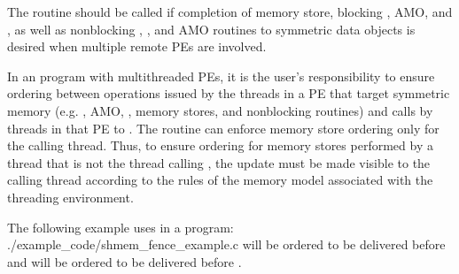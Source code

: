 \begin{apidefinition}
{    The  routine should be called if completion of memory
    store, blocking \PUT{}, \ac{AMO}, and , as well as
    nonblocking \PUT{}, , and \ac{AMO} routines to symmetric data objects is desired
    when multiple remote \acp{PE} are involved.

    In an \openshmem program with multithreaded \acp{PE}, it is the
    user's responsibility to ensure ordering between operations issued by the threads
    in a \ac{PE} that target symmetric memory (e.g. \PUT{}, \ac{AMO}, , memory stores,
    and nonblocking routines) and calls by threads in that \ac{PE} to
    . The  routine can enforce memory store ordering only for the
    calling thread. Thus, to ensure ordering for memory stores performed by a thread that is
    not the thread calling , the update must be made visible to the
    calling thread according to the rules of the memory model associated with
    the threading environment.
}

\begin{apiexamples}

\apicexample
    {The following example uses  in a \Cstd[11] program: }
    {./example_code/shmem_fence_example.c}
    { will be ordered to be delivered before  and 
    will be ordered to be delivered before .}

\end{apiexamples}

\end{apidefinition}
